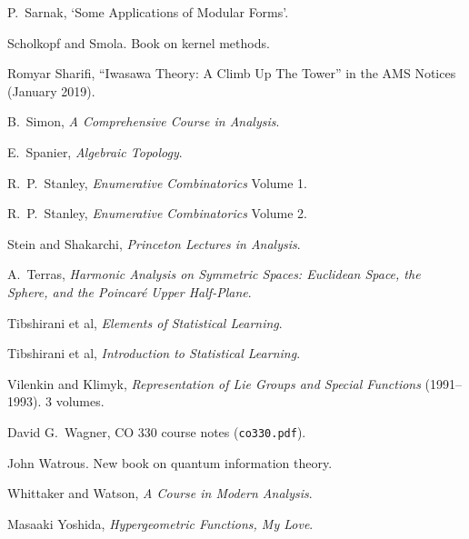 \begin{thebibliography}{}
P.\ Sarnak, `Some Applications of Modular Forms'.

Scholkopf and Smola. Book on kernel methods.

Romyar Sharifi, ``Iwasawa Theory: A Climb Up The Tower'' in the AMS Notices (January 2019).

B.\ Simon, \emph{A Comprehensive Course in Analysis}.

E.\ Spanier, \emph{Algebraic Topology}.

R.\ P.\ Stanley, \emph{Enumerative Combinatorics} Volume 1.

R.\ P.\ Stanley, \emph{Enumerative Combinatorics} Volume 2.

Stein and Shakarchi, \emph{Princeton Lectures in Analysis}.

A.\ Terras, \emph{Harmonic Analysis on Symmetric Spaces: Euclidean Space, the Sphere, and the Poincar\'e Upper Half-Plane}.

Tibshirani et al, \emph{Elements of Statistical Learning}.

Tibshirani et al, \emph{Introduction to Statistical Learning}.

Vilenkin and Klimyk, \emph{Representation of Lie Groups and Special Functions} (1991--1993). 3 volumes.

David G.\ Wagner, CO 330 course notes (\texttt{co330.pdf}).

John Watrous. New book on quantum information theory.

Whittaker and Watson, \emph{A Course in Modern Analysis}.

Masaaki Yoshida, \emph{Hypergeometric Functions, My Love}.

\end{thebibliography}